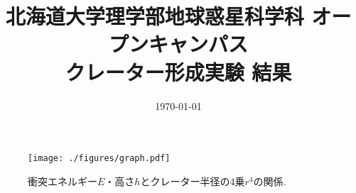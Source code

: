 \documentclass[a4paper]{ltjsarticle}
\begin{document}
\title{北海道大学理学部地球惑星科学科 オープンキャンパス\\クレーター形成実験 結果}
\date{\today}
\maketitle
\thispagestyle{empty}
\begin{figure}[H]
    \centering
    \texttt{[image: ./figures/graph.pdf]}
    \caption{衝突エネルギー$E$・高さ$h$とクレーター半径の4乗$r^4$の関係.}
\end{figure}
\end{document}
